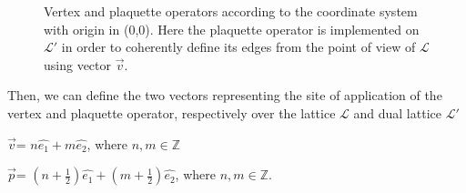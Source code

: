 \documentclass{Configuration_Files/PoliMi3i_thesis}
\begin{document}
\begin{figure}
\begin{center}
\end{center}

\caption{Vertex and plaquette operators according to the coordinate system with origin in (0,0). Here the plaquette operator is implemented on $\mathcal{L}'$ in order to coherently define its edges from the point of view of $\mathcal{L}$ using vector $\vec{v}$.}
\label{fig:coordinate_system}
\end{figure}


Then, we can define the two vectors representing the site of application of the vertex and plaquette operator, respectively over the lattice $\mathcal{L}$ and dual lattice $\mathcal{L}'$ \newline

\begin{center}
	$\vec{v}$= $n\hat{e_1} + m\hat{e_2}$, where $n,m \in \mathbb{Z}$ 
	
	$\vec{p}$= $(n + \frac{1}{2}) \hat{e_1} + (m + \frac{1}{2}) \hat{e_2}$, where $n,m \in \mathbb{Z}$.
\end{center}
\end{document}
